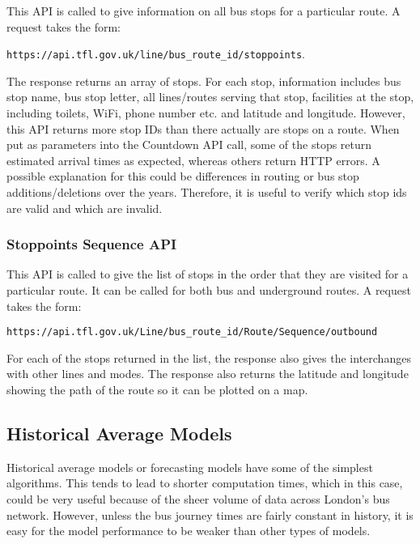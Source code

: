 This API is called to give information on all bus stops for a particular route. A request takes the form:

\begin{center}
\texttt{https://api.tfl.gov.uk/line/bus\_route\_id/stoppoints}.
\end{center}

The response returns an array of stops. For each stop, information includes bus stop name, bus stop letter, all lines/routes serving that stop, facilities at the stop, including toilets, WiFi, phone number etc. and latitude and longitude. However, this API returns more stop IDs than there actually are stops on a route. When put as parameters into the Countdown API call, some of the stops return estimated arrival times as expected, whereas others return HTTP errors. A possible explanation for this could be differences in routing or bus stop additions/deletions over the years. Therefore, it is useful to verify which stop ids are valid and which are invalid. 

\subsubsection{Stoppoints Sequence API}

This API is called to give the list of stops in the order that they are visited for a particular route. It can be called for both bus and underground routes. A request takes the form: 

\begin{center}
    \texttt{https://api.tfl.gov.uk/Line/bus\_route\_id/Route/Sequence/outbound}
\end{center}

For each of the stops returned in the list, the response also gives the interchanges with other lines and modes. The response also returns the latitude and longitude showing the path of the route so it can be plotted on a map.

\subsection{Historical Average Models}
\label{section:historical-avg-models-research}

Historical average models or forecasting models have some of the simplest algorithms. This tends to lead to shorter computation times, which in this case, could be very useful because of the sheer volume of data across London's bus network. However, unless the bus journey times are fairly constant in history, it is easy for the model performance to be weaker than other types of models. 

